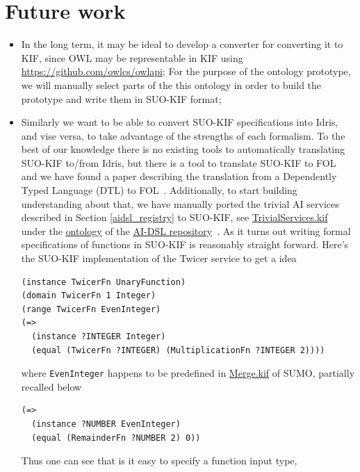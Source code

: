 \documentclass[]{report}
\begin{document}
\section{Future work}

\begin{itemize}
  \item In the long term, it may be ideal to develop a converter for converting
it to KIF, since OWL may be representable in KIF
\cite{martin_translations_nodate}  using \href{OWL
API}{https://github.com/owlcs/owlapi}; For the purpose of the ontology
prototype, we will manually select parts of the this ontology in order to build
the prototype and write them in SUO-KIF format;
  \item Similarly we want to be able to convert SUO-KIF specifications
    into Idris, and vise versa, to take advantage of the strengths of
    each formalism.  To the best of our knowledge there is no existing
    tools to automatically translating SUO-KIF to/from Idris, but
    there is a tool to translate SUO-KIF to
    FOL~\cite{Pease_firstorder} and we have found a paper describing
    the translation from a Dependently Typed Language (DTL) to
    FOL~\cite{SojakovaKristina2009}.  Additionally, to start building
    understanding about that, we have manually ported the trivial AI
    services described in Section \ref{aidsl_registry} to SUO-KIF, see
    \href{https://github.com/singnet/ai-dsl/blob/master/ontology/TrivialServices.kif}{TrivialServices.kif}
    under the
    \href{https://github.com/singnet/ai-dsl/blob/master/ontology}{ontology}
    of the \href{https://github.com/singnet/ai-dsl/}{AI-DSL
      repository}~\cite{AIDSLRepo}.  As it turns out writing formal
    specifications of functions in SUO-KIF is reasonably straight
    forward.  Here's the SUO-KIF implementation of the Twicer service
    to get a idea
\begin{verbatim}
(instance TwicerFn UnaryFunction)
(domain TwicerFn 1 Integer)
(range TwicerFn EvenInteger)
(=>
  (instance ?INTEGER Integer)
  (equal (TwicerFn ?INTEGER) (MultiplicationFn ?INTEGER 2))))
\end{verbatim}
where \texttt{EvenInteger} happens to be predefined in
\href{https://github.com/ontologyportal/sumo/blob/master/Merge.kif}{Merge.kif}
of SUMO, partially recalled below
\begin{verbatim}
(=>
  (instance ?NUMBER EvenInteger)
  (equal (RemainderFn ?NUMBER 2) 0))
\end{verbatim}
Thus one can see that is it easy to specify a function input type,

\end{itemize}
\end{document}

